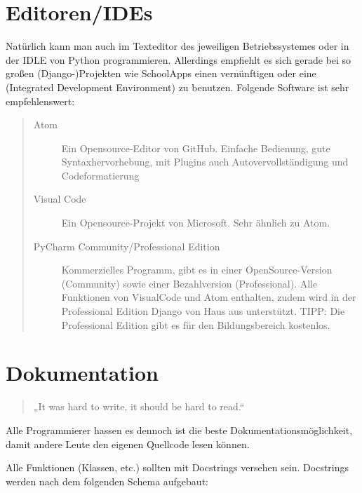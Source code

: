 \documentclass[letterpaper,10pt,ngerman]{sphinxmanual}
\begin{document}
\section{Editoren/IDEs}
\label{\detokenize{dev/dev:editoren-ides}}
Natürlich kann man auch im Texteditor des jeweiligen Betriebssystemes oder in der IDLE von Python programmieren.
Allerdings empfiehlt es sich gerade bei so großen (Django-)Projekten wie SchoolApps einen vernünftigen  oder eine  (Integrated Development Environment) zu benutzen.
Folgende Software ist sehr empfehlenswert:
\begin{quote}
\begin{description}
\item[{Atom}] \leavevmode
Ein Opensource-Editor von GitHub. Einfache Bedienung, gute Syntaxhervorhebung, mit Plugins auch Autovervollständigung und Codeformatierung

\item[{Visual Code}] \leavevmode
Ein Opensource-Projekt von Microsoft. Sehr ähnlich zu Atom.

\item[{PyCharm Community/Professional Edition}] \leavevmode
Kommerzielles Programm, gibt es in einer OpenSource-Version (Community) sowie einer Bezahlversion (Professional). Alle Funktionen von VisualCode und Atom enthalten, zudem wird in der Professional Edition Django von Haus aus unterstützt. TIPP: Die Professional Edition gibt es für den Bildungsbereich kostenlos.

\end{description}
\end{quote}


\section{Dokumentation}
\label{\detokenize{dev/dev:dokumentation}}\begin{quote}

„It was hard to write, it should be hard to read.“
\end{quote}

Alle Programmierer hassen es \textendash{} dennoch ist  die beste Dokumentationsmöglichkeit, damit andere Leute den eigenen Quellcode lesen können.

Alle Funktionen (Klassen, etc.) sollten mit Docstrings versehen sein. Docstrings werden nach dem folgenden Schema aufgebaut: 
\end{document}
